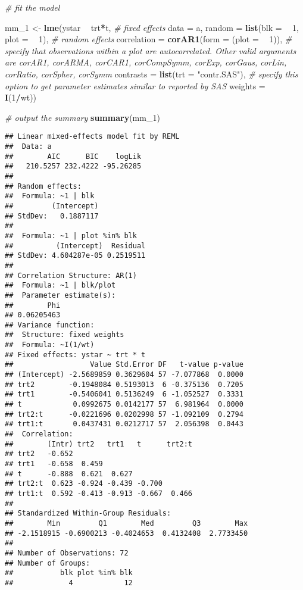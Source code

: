 \documentclass[]{book}
\newenvironment{Shaded}{\begin{snugshade}}{\end{snugshade}}
\newcommand{\CommentTok}[1]{\textcolor[rgb]{0.56,0.35,0.01}{\textit{#1}}}
\newcommand{\DataTypeTok}[1]{\textcolor[rgb]{0.13,0.29,0.53}{#1}}
\newcommand{\DecValTok}[1]{\textcolor[rgb]{0.00,0.00,0.81}{#1}}
\newcommand{\KeywordTok}[1]{\textcolor[rgb]{0.13,0.29,0.53}{\textbf{#1}}}
\newcommand{\NormalTok}[1]{#1}
\newcommand{\OperatorTok}[1]{\textcolor[rgb]{0.81,0.36,0.00}{\textbf{#1}}}
\newcommand{\StringTok}[1]{\textcolor[rgb]{0.31,0.60,0.02}{#1}}
\begin{document}
\begin{Shaded}
\begin{Highlighting}[]
\CommentTok{# fit the model}

\NormalTok{mm_}\DecValTok{1}\NormalTok{ <-}\StringTok{ }\KeywordTok{lme}\NormalTok{(ystar }\OperatorTok{~}\StringTok{ }\NormalTok{trt}\OperatorTok{*}\NormalTok{t, }\CommentTok{# fixed effects}
            \DataTypeTok{data =}\NormalTok{ a, }
            \DataTypeTok{random =} \KeywordTok{list}\NormalTok{(}\DataTypeTok{blk =} \OperatorTok{~}\StringTok{ }\DecValTok{1}\NormalTok{, }\DataTypeTok{plot =} \OperatorTok{~}\StringTok{ }\DecValTok{1}\NormalTok{), }\CommentTok{# random effects}
            \DataTypeTok{correlation =} \KeywordTok{corAR1}\NormalTok{(}\DataTypeTok{form =}\NormalTok{ (}\DataTypeTok{plot =} \OperatorTok{~}\StringTok{ }\DecValTok{1}\NormalTok{)), }\CommentTok{# specify that observations within a plot are autocorrelated. Other valid arguments are corAR1, corARMA, corCAR1, corCompSymm, corExp, corGaus, corLin, corRatio, corSpher, corSymm}
            \DataTypeTok{contrasts =} \KeywordTok{list}\NormalTok{(}\DataTypeTok{trt =} \StringTok{"contr.SAS"}\NormalTok{), }\CommentTok{# specify this option to get parameter estimates similar to reported by SAS}
            \DataTypeTok{weights =} \OperatorTok{~}\StringTok{ }\KeywordTok{I}\NormalTok{(}\DecValTok{1}\OperatorTok{/}\NormalTok{wt))}

\CommentTok{# output the summary}
\KeywordTok{summary}\NormalTok{(mm_}\DecValTok{1}\NormalTok{)}
\end{Highlighting}
\end{Shaded}

\begin{verbatim}
## Linear mixed-effects model fit by REML
##  Data: a 
##        AIC      BIC    logLik
##   210.5257 232.4222 -95.26285
## 
## Random effects:
##  Formula: ~1 | blk
##         (Intercept)
## StdDev:   0.1887117
## 
##  Formula: ~1 | plot %in% blk
##          (Intercept)  Residual
## StdDev: 4.604287e-05 0.2519511
## 
## Correlation Structure: AR(1)
##  Formula: ~1 | blk/plot 
##  Parameter estimate(s):
##        Phi 
## 0.06205463 
## Variance function:
##  Structure: fixed weights
##  Formula: ~I(1/wt) 
## Fixed effects: ystar ~ trt * t 
##                  Value Std.Error DF   t-value p-value
## (Intercept) -2.5689859 0.3629604 57 -7.077868  0.0000
## trt2        -0.1948084 0.5193013  6 -0.375136  0.7205
## trt1        -0.5406041 0.5136249  6 -1.052527  0.3331
## t            0.0992675 0.0142177 57  6.981964  0.0000
## trt2:t      -0.0221696 0.0202998 57 -1.092109  0.2794
## trt1:t       0.0437431 0.0212717 57  2.056398  0.0443
##  Correlation: 
##        (Intr) trt2   trt1   t      trt2:t
## trt2   -0.652                            
## trt1   -0.658  0.459                     
## t      -0.888  0.621  0.627              
## trt2:t  0.623 -0.924 -0.439 -0.700       
## trt1:t  0.592 -0.413 -0.913 -0.667  0.466
## 
## Standardized Within-Group Residuals:
##        Min         Q1        Med         Q3        Max 
## -2.1518915 -0.6900213 -0.4024653  0.4132408  2.7733450 
## 
## Number of Observations: 72
## Number of Groups: 
##           blk plot %in% blk 
##             4            12
\end{verbatim}
\end{document}
